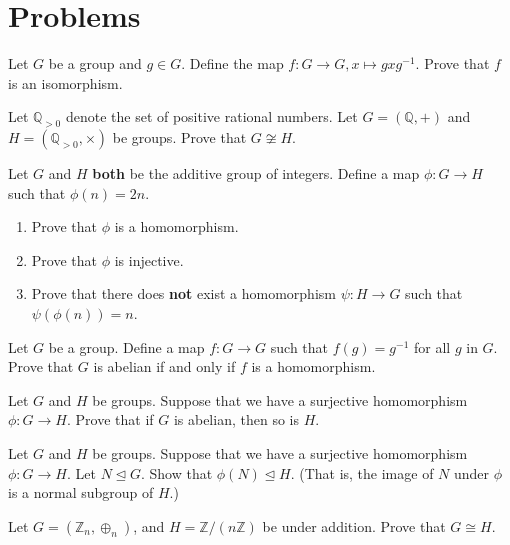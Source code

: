 \newpage

\section{Problems}
\begin{problem}
    Let $G$ be a group and $g \in G$. Define the map $f: G \to G, x \mapsto gxg^{-1}$. Prove that $f$ is an isomorphism.
\end{problem}

\begin{problem}
    Let $\mathbb{Q}_{>0}$ denote the set of positive rational numbers. Let $G = (\mathbb{Q}, +)$ and $H = (\mathbb{Q}_{>0}, \times)$ be groups. Prove that $G \not\cong H$.
\end{problem}

\begin{problem}
    Let $G$ and $H$ \textbf{both} be the additive group of integers. Define a map $\phi: G \to H$ such that $\phi(n) = 2n$.
    \begin{enumerate}[label=(\alph*)]
        \item Prove that $\phi$ is a homomorphism.
        \item Prove that $\phi$ is injective.
        \item Prove that there does \textbf{not} exist a homomorphism $\psi: H \to G$ such that $\psi(\phi(n)) = n$.
    \end{enumerate}
\end{problem}

\begin{problem}
    Let $G$ be a group. Define a map $f: G \to G$ such that $f(g) = g^{-1}$ for all $g$ in $G$. Prove that $G$ is abelian if and only if $f$ is a homomorphism.
\end{problem}

\begin{problem}
    Let $G$ and $H$ be groups. Suppose that we have a surjective homomorphism $\phi: G \to H$. Prove that if $G$ is abelian, then so is $H$.
\end{problem}

\begin{problem}
    Let $G$ and $H$ be groups. Suppose that we have a surjective homomorphism $\phi: G \to H$. Let $N \unlhd G$. Show that $\phi(N) \unlhd H$.\newline
    (That is, the image of $N$ under $\phi$ is a normal subgroup of $H$.)
\end{problem}

\begin{problem}\label{problem-Zn-isomorphic-to-Z-by-nZ}
    Let $G = (\mathbb{Z}_n, \oplus_n)$, and $H = \mathbb{Z}/(n\mathbb{Z})$ be under addition. Prove that $G \cong H$.
\end{problem}

